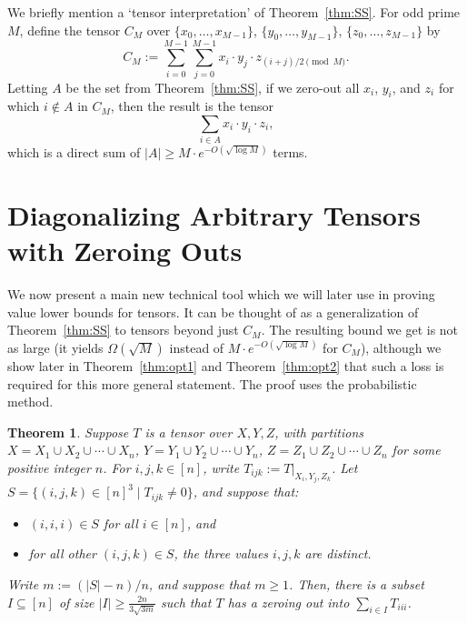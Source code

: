 \PassOptionsToPackage{shortlabels}{enumitem}\documentclass[10pt,a4paper]{article}
\newtheorem{theorem}{Theorem}[section]
\begin{document}
We briefly mention a `tensor interpretation' of Theorem~\ref{thm:SS}. For odd prime $M$, define the tensor $C_M$ over $\{x_0, \ldots, x_{M-1}\}$, $\{y_0, \ldots, y_{M-1}\}$, $\{z_0, \ldots, z_{M-1}\}$ by $$C_M := \sum_{i=0}^{M-1} \sum_{j=0}^{M-1} x_i \cdot y_j \cdot z_{(i+j)/2 \pmod{M}}.$$ Letting $A$ be the set from Theorem~\ref{thm:SS}, if we zero-out all $x_i$, $y_i$, and $z_i$ for which $i \notin A$ in $C_M$, then the result is the tensor $$\sum_{i \in A} x_i \cdot y_i \cdot z_{i},$$ which is a direct sum of $|A|\geq M \cdot e^{-O(\sqrt{\log M})}$ terms. 



\section{Diagonalizing Arbitrary Tensors with Zeroing Outs} \label{sec:newidea}

We now present a main new technical tool which we will later use in proving value lower bounds for tensors. It can be thought of as a generalization of Theorem~\ref{thm:SS} to tensors beyond just $C_M$. The resulting bound we get is not as large (it yields $\Omega(\sqrt{M})$ instead of $M \cdot e^{-O(\sqrt{\log M})}$ for $C_M$), although we show later in Theorem~\ref{thm:opt1} and Theorem~\ref{thm:opt2} that such a loss is required for this more general statement. The proof uses the probabilistic method.

\begin{theorem} \label{thm:newidea}
Suppose $T$ is a tensor over $X,Y,Z$, with partitions $X = X_1 \cup X_2 \cup \cdots \cup X_{n}$, $Y = Y_1 \cup Y_2 \cup \cdots \cup Y_{n}$, $Z = Z_1 \cup Z_2 \cup \cdots \cup Z_{n}$ for some positive integer $n$. For $i,j,k \in [n]$, write $T_{ijk} := T|_{X_i, Y_j, Z_k}$. Let $S = \{(i,j,k) \in [n]^3 \mid T_{ijk} \neq 0 \}$, and suppose that:
\begin{itemize}
    \item $(i,i,i) \in S$ for all $i \in [n]$, and
    \item for all other $(i,j,k) \in S$, the three values $i,j,k$ are distinct.
\end{itemize}
Write $m := (|S|-n)/n$, and suppose that $m \geq 1$. Then, there is a subset $I \subseteq [n]$ of size $|I| \geq \frac{2n}{3 \sqrt{3m}}$ such that $T$ has a zeroing out into $\sum_{i \in I} T_{iii}$.
\end{theorem}
\end{document}

